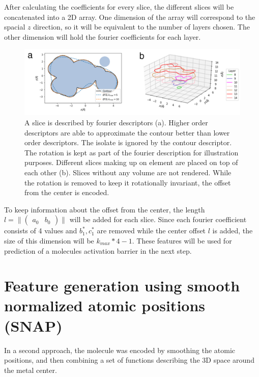 After calculating the coefficients for every slice, the different slices will be concatenated into a 2D array.
One dimension of the array will correspond to the spacial $z$ direction, so it will be equivalent to the number of layers chosen.
The other dimension will hold the fourier coefficients for each layer.
\begin{figure}[H]
  \includegraphics[width=1.0\textwidth]{figures/fourier/snap-layered.png}
  \caption[Slices produced by LEFD encoder]{
  A slice is described by fourier descriptors (a). Higher order descriptors are able to approximate the contour better than lower order descriptors. 
  The isolate is ignored by the contour descriptor. The rotation is kept as part of the fourier description for illustration purposes.
  Different slices making up on element are placed on top of each other (b). Slices without any volume are not rendered. 
  While the rotation is removed to keep it rotationally invariant, the offset from the center is encoded.
  }
  \label{fig:slice-layered}
\end{figure}

To keep information about the offset from the center, the length $l = \| \begin{pmatrix} a_0 & b_0 \end{pmatrix} \| $ will be added for each slice.
Since each fourier coefficient consists of 4 values and $b_1^*, c_1^*$ are removed while the center offset $l$ is added, the size of this dimension will be $k_{max} * 4 - 1$.
These features will be used for prediction of a molecules activation barrier in the next step.


\newpage
\section{Feature generation using smooth normalized atomic positions (SNAP)}
\label{ch:SNAP}
In a second approach, the molecule was encoded by smoothing the atomic positions, 
and then combining a set of functions describing the 3D space around the metal center.

